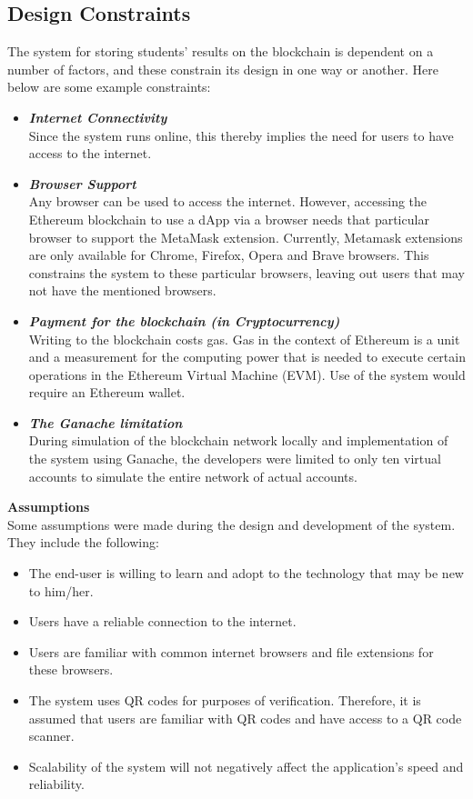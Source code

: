 \subsection{Design Constraints}
The system for storing students' results on the blockchain is dependent on a number of factors, and these constrain its design in one way or another. Here below are some example constraints: 
\begin{itemize}
\item \textbf{\textit{Internet Connectivity}}\\
Since the system runs online, this thereby implies the need for users to have access to the internet.
\item \textbf{\textit{Browser Support}}\\
Any browser can be used to access the internet. However, accessing the Ethereum blockchain to use a dApp via a browser needs that particular browser to support the MetaMask extension. Currently, Metamask extensions are only available for Chrome, Firefox, Opera and Brave browsers. This constrains the system to these particular browsers, leaving out users that may not have the mentioned browsers.
\item \textbf{\textit{Payment for the blockchain (in Cryptocurrency)}}\\
Writing to the blockchain costs gas. Gas in the context of Ethereum is a unit and a measurement for the computing power that is needed to execute certain operations in the Ethereum Virtual Machine (EVM). Use of the system would require an Ethereum wallet\cite{art19}.
\item \textbf{\textit{The Ganache limitation}}\\
During simulation of the blockchain network locally and implementation of the system using Ganache, the developers were limited to only ten virtual accounts to simulate the entire network of actual accounts.
\end{itemize}
\textbf{Assumptions}\\
Some assumptions were made during the design and development of the system. They include the following:\\
\begin{itemize}
\item The end-user is willing to learn and adopt to the technology that may be new to him/her.
\item Users have a reliable connection to the internet.
\item Users are familiar with common internet browsers and file extensions for these browsers.
\item The system uses QR codes for purposes of verification. Therefore, it is assumed that users are familiar with QR codes and have access to a QR code scanner.
\item Scalability of the system will not negatively affect the application’s speed and reliability.
\end{itemize}

